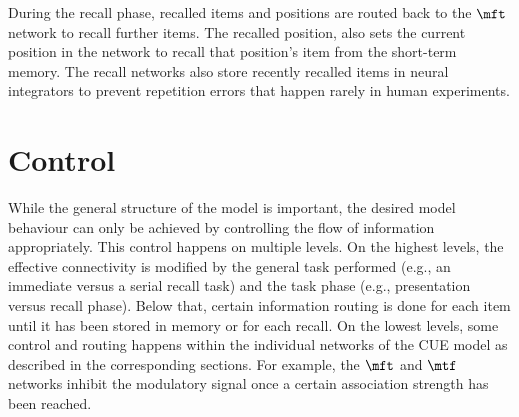 During the recall phase, recalled items and positions are routed back to the $\mft$ network to recall further items.
The recalled position, also sets the current position in the  network to recall that position's item from the  short-term memory.
The recall networks also store recently recalled items in neural integrators to prevent repetition errors that happen rarely in human experiments.


\section{Control}\label{sec:control}
While the general structure of the model is important, the desired model behaviour can only be achieved by controlling the flow of information appropriately.
This control happens on multiple levels.
On the highest levels, the effective connectivity is modified by the general task performed (e.g., an immediate versus a serial recall task) and the task phase (e.g., presentation versus recall phase).
Below that, certain information routing is done for each item until it has been stored in memory or for each recall.
On the lowest levels, some control and routing happens within the individual networks of the CUE model as described in the corresponding sections.
For example, the $\mft$ and $\mtf$ networks inhibit the modulatory signal once a certain association strength has been reached.

